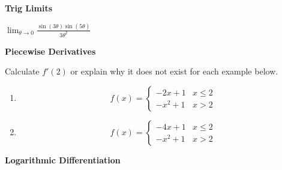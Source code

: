 \documentclass{ximera}
\begin{document}
\textbf{Trig Limits}
   \begin{exercise}
    $\displaystyle\lim_{\theta \rightarrow 0}\frac{\sin(3\theta)\sin(5\theta)}{3\theta^2}$\\
   \end{exercise}

\textbf{Piecewise Derivatives}
   \begin{exercise}
      Calculate $f'(2)$ or explain why it does not exist for each example below.
      \begin{enumerate}
         \item \[f(x)=\begin{cases}
         -2x+1 & x\leq 2\\
         -x^2+1 & x>2
      \end{cases}\]
      \item \[f(x)=\begin{cases}
         -4x+1 & x\leq 2\\
         -x^2+1 & x>2
      \end{cases}\]
    \end{enumerate}
   \end{exercise}


\textbf{Logarithmic Differentiation}
\end{document}
